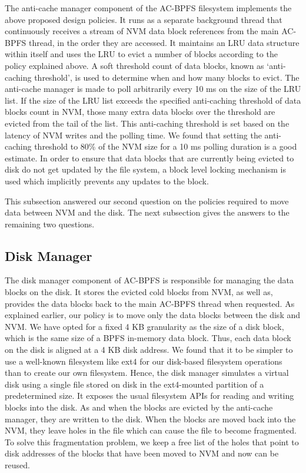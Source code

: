 The anti-cache manager component of the AC-BPFS filesystem implements the above proposed design policies. It runs as a separate background thread that continuously receives a stream of NVM data block references from the main AC-BPFS thread, in the order they are accessed. It maintains an LRU data structure within itself and uses the LRU to evict a number of blocks according to the policy explained above. A soft threshold count of data blocks, known as `anti-caching threshold', is used to determine when and how many blocks to evict. The anti-cache manager is made to poll arbitrarily every 10 ms on the size of the LRU list. If the size of the LRU list exceeds the specified anti-caching threshold of data blocks count in NVM, those many extra data blocks over the threshold are evicted from the tail of the list. This anti-caching threshold is set based on the latency of NVM writes and the polling time. We found that setting the anti-caching threshold to 80\% of the NVM size for a 10 ms polling duration is a good estimate. In order to ensure that data blocks that are currently being evicted to disk do not get updated by the file  system, a block level locking mechanism is used which implicitly prevents any updates to the block.

This subsection answered our second question on the policies required to move data between NVM and the disk. The next subsection gives the answers to the remaining two questions.

\subsection{Disk Manager}
The disk manager component of AC-BPFS is responsible for managing the data blocks on the disk. It stores the evicted cold blocks from NVM, as well as, provides the data blocks back to the main AC-BPFS thread when requested. As explained earlier, our policy is to move only the data blocks between the disk and NVM. We have opted for a fixed 4 KB granularity as the size of a disk block, which is the same size of a BPFS in-memory data block. Thus, each data block on the disk is aligned at a 4 KB disk address. We found that it to be simpler to use a well-known filesystem like ext4 for our disk-based filesystem operations than to create our own filesystem. Hence, the disk manager simulates a virtual disk using a single file stored on disk in the ext4-mounted partition of a predetermined size. It exposes the usual filesystem APIs for reading and writing blocks into the disk. As and when the blocks are evicted by the anti-cache manager, they are written to the disk. When the blocks are moved back into the NVM, they leave holes in the file which can cause the file to become fragmented. To solve this fragmentation problem, we keep a free list of the holes that point to disk addresses of the blocks that have been moved to NVM and now can be reused.

